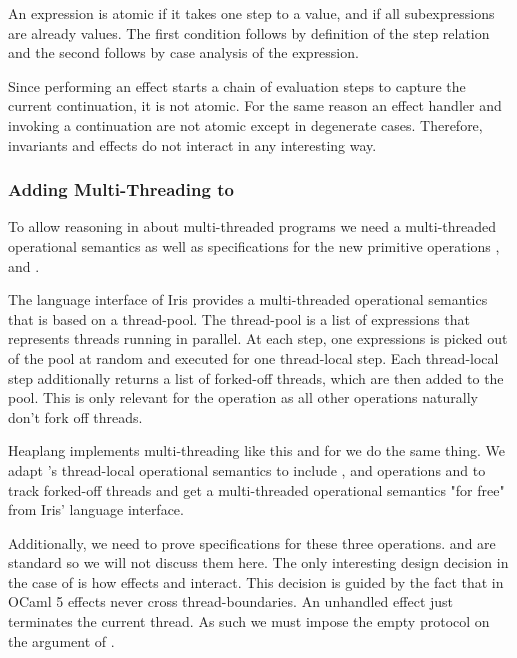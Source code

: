 An expression is atomic if it takes one step to a value, and if all subexpressions are already values.
The first condition follows by definition of the step relation and the second follows by case analysis of the expression.

Since performing an effect starts a chain of evaluation steps to capture the current continuation, it is not atomic.
For the same reason an effect handler and invoking a continuation are not atomic except in degenerate cases.
Therefore, invariants and effects do not interact in any interesting way.

\subsubsection*{Adding Multi-Threading to \hazel{}}

To allow reasoning in \hazel{} about multi-threaded programs we need a multi-threaded operational semantics as well as specifications for the new primitive operations \efork{},  and .

The language interface of Iris provides a multi-threaded operational semantics that is based on a thread-pool.
The thread-pool is a list of expressions that represents threads running in parallel.
At each step, one expressions is picked out of the pool at random and executed for one thread-local step.
Each thread-local step additionally returns a list of forked-off threads, which are then added to the pool.
This is only relevant for the \efork{} operation as all other operations naturally don't fork off threads.


Heaplang implements multi-threading like this and for \hazel{} we do the same thing.
We adapt \hazel{}'s thread-local operational semantics to include \efork{},  and  operations and to track forked-off threads and get a multi-threaded operational semantics "for free" from Iris' language interface.

Additionally, we need to prove specifications for these three operations.
 and  are standard so we will not discuss them here.
The only interesting design decision in the case of \hazel{} is how effects and \efork{} interact.
This decision is guided by the fact that in OCaml 5 effects never cross thread-boundaries.
An unhandled effect just terminates the current thread.
As such we must impose the empty protocol on the argument of \efork{}.

